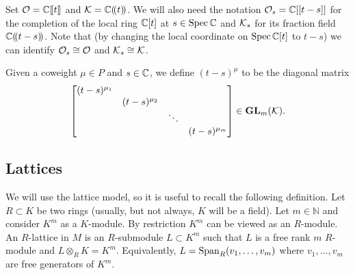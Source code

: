 \documentclass[draft]{article}
\begin{document}
Set $\cO = \CC\xt$ and $\cK = \CC\xT$. We will also need the notation $\cO_s = \CC[[t-s]]$ for the completion of the local ring $\CC[t]$ at $s\in\spec\CC$ and $\cK_s$ for its fraction field $\CC\xT[t-s]$. 
% 
Note that (by changing the local coordinate on $\spec\CC[t]$ to $t-s$) we can identify $\cO_s \cong \cO$ and $\cK_s\cong\cK$. 

Given a coweight $\mu \in P$ and $ s\in \CC$, we define $ (t-s)^\mu$ to be the diagonal matrix 
\[
\begin{bmatrix}
    (t-s)^{\mu_1} \\
    & (t-s)^{\mu_2} \\ 
    & & \ddots \\
    & & & (t-s)^{\mu_m}
\end{bmatrix} \in \GL_m(\cK).
\]
% 


\subsection{Lattices}
\label{ss:lat}
We will use the lattice model, so it is useful to recall the following definition.  Let $ R \subset K$ be two rings (usually, but not always, $K$ will be a field).  Let $ m \in \mathbb N$ and consider $ K^m $ as a $K$-module.   By restriction $ K^m$ can be viewed as an $R$-module.  An $R$-lattice in $M$ is an $R$-submodule $ L \subset K^m$ such that $ L $ is a free rank $ m $ $R$-module and $ L \otimes_R K = K^m $.  Equivalently, $ L = \Sp_R(v_1, \dots, v_m)$ where $v_1, \dots, v_m$ are free generators of $K^m$. 
\end{document}
